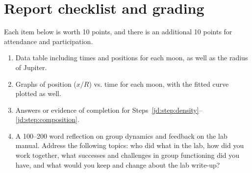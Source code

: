 \section{Report checklist and grading}

Each item below is worth 10 points, and there is an additional 10 points for attendance and participation.

\begin{enumerate}
	\item Data table including times and positions for each moon, as well as the radius of Jupiter.
	
	\item Graphs of position ($x/R$) vs. time for each moon, with the fitted curve plotted as well.
	
	\item Answers or evidence of completion for Steps~\ref{jd:step:density}--\ref{jd:step:composition}.
	
	\item A 100--200 word reflection on group dynamics and feedback on the lab manual. Address the following topics: who did what in the lab, how did you work together, what successes and challenges in group functioning did you have, and what would you keep and change about the lab write-up?
	
\end{enumerate}